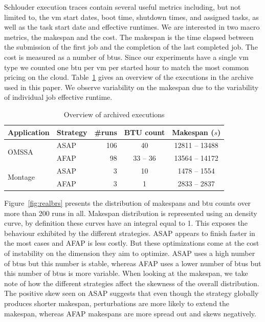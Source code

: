 \documentclass[10pt,conference,compsocconf]{IEEEtran}
\begin{document}
Schlouder execution traces contain several useful metrics including, but not
limited to, the \ac{vm} start dates, boot time, shutdown times, and assigned
tasks, as well as the task start date and effective runtimes. We are interested in
two macro metrics, the makespan and the cost.  The makespan is the time elapsed
between the submission of the first job and the completion of the last completed
job. The cost is measured as a number of \acp{btu}. Since our experiments have a
single \ac{vm} type we counted one \ac{btu} per \ac{vm} per started hour to
match the most common pricing on the cloud. Table~\ref{tab:nbruns} gives an
overview of the executions in the archive used in this paper. We observe
variability on the makespan due to the variability of individual job effective
runtime.
\begin{table}
	\centering
	\caption{Overview of archived executions}\label{tab:nbruns}
	\begin{tabular}{llrcc}
		\toprule
		Application&Strategy&\#runs&BTU count&Makespan ($s$)\\
		\midrule
		\multirow{2}{*}{OMSSA}&ASAP&106&40&12811 -- 13488\\
				      &AFAP&98&33 -- 36&13564 -- 14172\\
		\midrule
		\multirow{2}{*}{Montage}&ASAP&3&10&1478 -- 1554\\
					&AFAP&3&1&2833 -- 2837\\
		\bottomrule
	\end{tabular}
\end{table}


Figure~\ref{fig:realbrs}  presents the  distribution of  makespans and  \ac{btu}
counts over  more than  200 runs in all. Makespan distribution is represented
using an density curve, by definition these curves have an integral equal to 1.
This exposes the  behaviour exhibited  by the
different strategies. ASAP  appears to finish faster in the  most cases and AFAP
is less costly. But  these optimizations come at the cost  of instability on the
dimension they  aim to  optimize. ASAP uses  a high number  of \ac{btu}s  but this
number is stable, whereas AFAP uses a lower number of \ac{btu}s  
but this number of \ac{btu}s is  more variable.  When
looking at the makespan, we take note of how the different strategies affect the
skewness of  the overall distribution. The  positive skew seen on  ASAP suggests
that even though  the strategy globally produces  shorter makespan, perturbations
are more likely  to extend the makespan, whereas AFAP  makespans are more spread
out and skews negatively.
\end{document}
